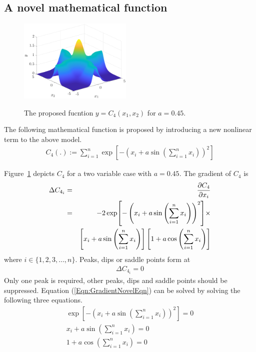 \documentclass[twocolumn]{svjour3}          %
\begin{document}
\subsection{A novel mathematical function}
\begin{figure}
	\centering
	\includegraphics[width=0.48\textwidth]{images/2FactorsModifiedSine}
	\label{Fig:TwoVarNovelFunc}
	\caption{The proposed fucntion $y=C_4(x_1, x_2)$ for $a = 0.45$.}
\end{figure}
The following mathematical function is proposed by introducing a new nonlinear term to the above model.
\begin{eqnarray}
	C_4(.) := \sum_{i=1}^{n}{\exp[-\left(x_i + a\sin\left(\sum_{i=1}^{n} x_i\right)\right)^2]} \label{Eqn:Novelmodel}
\end{eqnarray}
\par
Figure~\ref{Fig:TwoVarNovelFunc} depicts $C_4$ for a two variable case with $a=0.45$. The gradient of $C_4$ is
\begin{eqnarray}
	\Delta C_{4_i} &=& \pdv{C_4}{x_i} \nonumber\\
	&=& -2\exp[-\left(x_i + a\sin\left(\sum_{i=1}^{n} x_i\right)\right)^2] \times \nonumber\\
	&& \left[ x_i + a\sin\left(\sum_{i=1}^{n} x_i\right) \right] \left[1 + a\cos\left(\sum_{i=1}^{n} x_i\right) \right] \label{Eqn:GradientNovelFunc}
\end{eqnarray}
where $i \in \{1, 2, 3, \dots, n\}$. Peaks, dips or saddle points form at 
\begin{eqnarray}
	\Delta C_{4_i}=0 \label{Eqn:GradientNovelEqn}
\end{eqnarray}
Only one peak is required, other peaks, dips and saddle points should be suppressed. Equation (\ref{Eqn:GradientNovelEqn}) can be solved by solving the following three equations.
\begin{eqnarray}
	\exp[-\left(x_i + a\sin\left(\sum_{i=1}^{n} x_i\right)\right)^2]=0 \label{Eqn:GradientNovelEqn1} \\
	x_i + a\sin\left(\sum_{i=1}^{n} x_i\right)=0 \label{Eqn:GradientNovelSol2} \\
	1 + a\cos\left(\sum_{i=1}^{n} x_i\right)=0 \label{Eqn:GradientNovelEqn3}
\end{eqnarray}
\end{document}
